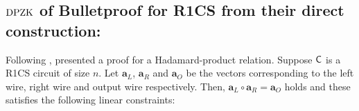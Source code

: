 \begin{comment}
sets $\mathsf{state}$ as fail, otherwise, pass.
Similarly, $\mathsf{state}$ is set for the remaining part of the protocol.
(This part is informally stated here, details will be provided in the full version.)
Now for both the protocols if $\mathsf{state}$ remains pass till the provers send the final messages to $\Ag$, which are the witnesses of the inner product arguments, 
\pnote{Should we add the details such as what are the consistency checks? From the protocol that is quite evident.}
then $\Sim$ calls the functionality $\Func_{\DPZK}$ with the input $\wit, x,y,z$ of the parties in $I$. If it outputs 1, then $\Sim$ generates the final messages of the honest parties using the accepting transcript produced by the zero-knowledge simulator, else $\Sim$ picks any random message which is consistent with the transcript so far.

If there is some inconsistency in some intermediate step, i.e., the $\mathsf{state}$ is fail, then $\Sim$ calls the functionality $\Func_{\DPZK}$ on some random value and proceeds accordingly with the simulation.

This proves that the view of the corrupt provers can be simulated, which ensures privacy of the honest provers.
\end{proof}

\end{comment}
\subsection{$\text{DPZK}$ of Bulletproof for R1CS from their direct construction:}\label{app:BulletproofsDPZK}
Following \cite{InnerProductDLS}, \cite{bulletproofs} presented a proof for a Hadamard-product relation. Suppose $\mathsf{C}$ is a R1CS circuit of size $n$. Let $\bm{a}_L$, $\bm{a}_R$ and $\bm{a}_O$ be the vectors corresponding to the left wire, right wire and output wire respectively. Then, $\bm{a}_L \circ \bm{a}_R = \bm{a}_O$ holds and these satisfies the following linear constraints: 

